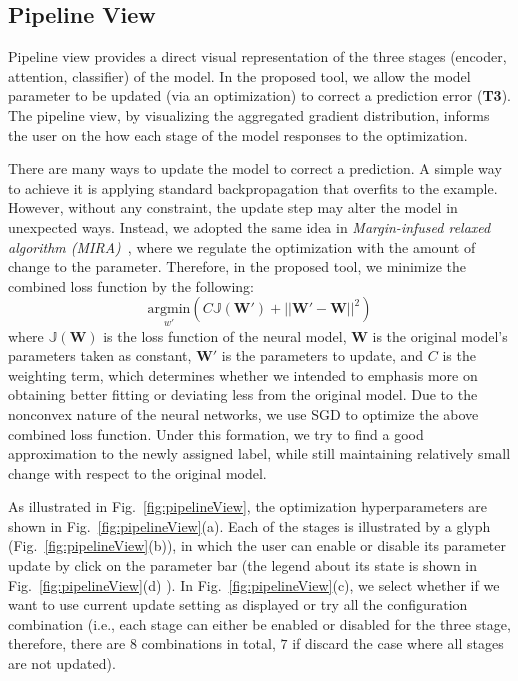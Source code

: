 \subsection{Pipeline View}
\label{sec:pipeline}
Pipeline view provides a direct visual representation of the three stages (encoder, attention, classifier) of the model. In the proposed tool, we allow the model parameter to be updated (via an optimization) to correct a prediction error (\textbf{T3}). The pipeline view, by visualizing the aggregated gradient distribution, informs the user on the how each stage of the model responses to the optimization.

There are many ways to update the model to correct a prediction. A simple way to achieve it is applying standard backpropagation that overfits to the example. However, without any constraint, the update step may alter the model in unexpected ways.
Instead, we adopted the same idea in \emph{Margin-infused relaxed algorithm (MIRA)}~\cite{CrammerSinger2003}, where we regulate the optimization with the amount of change to the parameter. Therefore, in the proposed tool, we minimize the combined loss function by the following:
\begin{equation}
\underset{w'}{\mathrm{argmin}}( C \mathbb{J}(\mathbf{W}') + ||\mathbf{W}' - \mathbf{W}||^2)
\end{equation}
where $\mathbb{J}(\mathbf{W})$ is the loss function of the neural model, $\mathbf{W}$ is the original model's parameters taken as constant, $\mathbf{W}'$ is the parameters to update, and $C$ is the weighting term, which determines whether we intended to emphasis more on obtaining better fitting or deviating less from the original model. Due to the nonconvex nature of the neural networks, we use SGD to optimize the above combined loss function.
%
Under this formation, we try to find a good approximation to the newly assigned label, while still maintaining relatively small change with respect to the original model.

As illustrated in Fig.~\ref{fig:pipelineView},
the optimization hyperparameters are shown in Fig.~\ref{fig:pipelineView}(a). Each of the stages is illustrated by a glyph (Fig.~\ref{fig:pipelineView}(b)), in which the user can enable or disable its parameter update by click on the parameter bar (the legend about its state is shown in Fig.~\ref{fig:pipelineView}(d) ). In Fig.~\ref{fig:pipelineView}(c), we select whether if we want to use current update setting as displayed or try all the configuration combination (i.e., each stage can either be enabled or disabled for the three stage, therefore, there are $8$ combinations in total, $7$ if discard the case where all stages are not updated).

